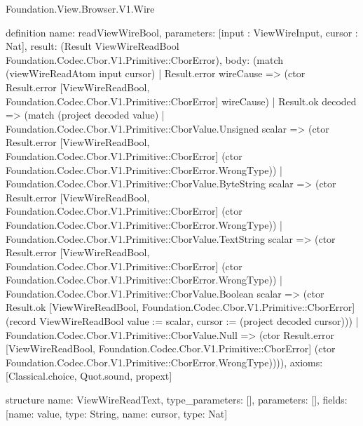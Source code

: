 \begin{lexlean}{Foundation.View.Browser.V1.Wire}
\begin{semanticmodule}
definition{
  name: readViewWireBool,
  parameters: [input : ViewWireInput, cursor : Nat],
  result: (Result ViewWireReadBool Foundation.Codec.Cbor.V1.Primitive::CborError),
  body: (match (viewWireReadAtom input cursor)
    | Result.error wireCause => (ctor Result.error [ViewWireReadBool, Foundation.Codec.Cbor.V1.Primitive::CborError] wireCause)
    | Result.ok decoded => (match (project decoded value)
      | Foundation.Codec.Cbor.V1.Primitive::CborValue.Unsigned scalar => (ctor Result.error [ViewWireReadBool, Foundation.Codec.Cbor.V1.Primitive::CborError] (ctor Foundation.Codec.Cbor.V1.Primitive::CborError.WrongType))
      | Foundation.Codec.Cbor.V1.Primitive::CborValue.ByteString scalar => (ctor Result.error [ViewWireReadBool, Foundation.Codec.Cbor.V1.Primitive::CborError] (ctor Foundation.Codec.Cbor.V1.Primitive::CborError.WrongType))
      | Foundation.Codec.Cbor.V1.Primitive::CborValue.TextString scalar => (ctor Result.error [ViewWireReadBool, Foundation.Codec.Cbor.V1.Primitive::CborError] (ctor Foundation.Codec.Cbor.V1.Primitive::CborError.WrongType))
      | Foundation.Codec.Cbor.V1.Primitive::CborValue.Boolean scalar => (ctor Result.ok [ViewWireReadBool, Foundation.Codec.Cbor.V1.Primitive::CborError] (record ViewWireReadBool {value := scalar, cursor := (project decoded cursor)}))
      | Foundation.Codec.Cbor.V1.Primitive::CborValue.Null => (ctor Result.error [ViewWireReadBool, Foundation.Codec.Cbor.V1.Primitive::CborError] (ctor Foundation.Codec.Cbor.V1.Primitive::CborError.WrongType)))),
  axioms: [Classical.choice, Quot.sound, propext]
}

structure{
  name: ViewWireReadText,
  type_parameters: [],
  parameters: [],
  fields: [{name: value, type: String}, {name: cursor, type: Nat}]
}


\end{semanticmodule}
\end{lexlean}
